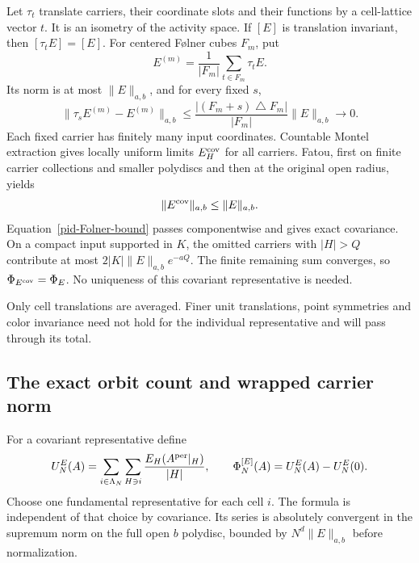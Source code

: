 Let $\tau_t$ translate carriers, their coordinate slots and their
functions by a cell-lattice vector $t$. It is an isometry of the
activity space. If $[E]$ is translation invariant, then
$[\tau_tE]=[E]$. For centered F\o lner cubes $F_m$, put
\begin{equation}
 E^{(m)}=\frac1{|F_m|}\sum_{t\in F_m}\tau_tE.
 \label{pid-Cesaro}
\end{equation}
Its norm is at most $\|E\|_{a,b}$, and for every fixed $s$,
\begin{equation}
 \|\tau_sE^{(m)}-E^{(m)}\|_{a,b}
 \le\frac{|(F_m+s)\mathbin\triangle F_m|}{|F_m|}
                                      \|E\|_{a,b}\longrightarrow0.
 \label{pid-Folner-bound}
\end{equation}
Each fixed carrier has finitely many input coordinates. Countable
Montel extraction gives locally uniform limits $E_H^{\rm cov}$
for all carriers. Fatou, first on finite carrier collections and
smaller polydiscs and then at the original open radius, yields
\begin{equation}
 \|E^{\rm cov}\|_{a,b}\le\|E\|_{a,b}.
 \label{pid-covariant-bound}
\end{equation}
Equation~\eqref{pid-Folner-bound} passes componentwise and gives
exact covariance. On a compact input supported in $K$, the
omitted carriers with $|H|>Q$ contribute at most
$2|K|\|E\|_{a,b}e^{-aQ}$. The finite remaining sum converges,
so $\Phi_{E^{\rm cov}}=\Phi_E$. No uniqueness of this covariant
representative is needed.

Only cell translations are averaged. Finer unit translations,
point symmetries and color invariance need not hold for the
individual representative and will pass through its total.

\subsection{The exact orbit count and wrapped carrier norm}
\label{pid-orbit-section}

For a covariant representative define
\begin{equation}
 U_N^E(A)=\sum_{i\in\Lambda_N}\sum_{H\ni i}
                 \frac{E_H(A^{\rm per}|_H)}{|H|},
 \qquad
 \Phi_N^{[E]}(A)=U_N^E(A)-U_N^E(0).
 \label{pid-density}
\end{equation}
Choose one fundamental representative for each cell $i$. The
formula is independent of that choice by covariance. Its series
is absolutely convergent in the supremum norm on the full open
$b$ polydisc, bounded by $N^d\|E\|_{a,b}$ before normalization.

